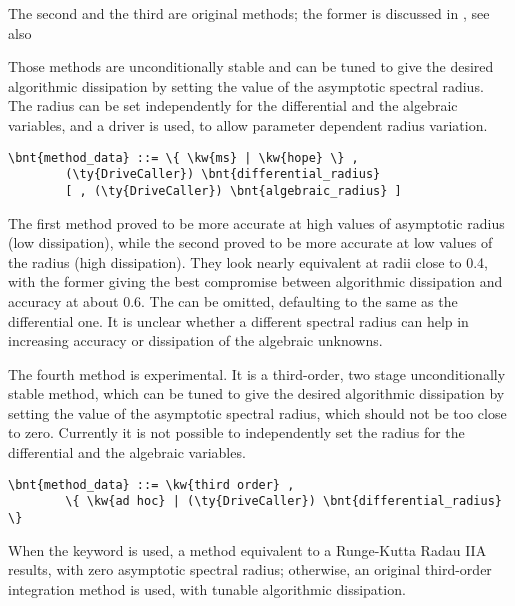 The second and the third are original 
methods; the former is discussed in \cite{MASARATI-LANZ-MANTEGAZZA-2001},
see also
\begin{quote}
\end{quote} 
Those methods are unconditionally stable and can be tuned to give 
the desired algorithmic dissipation
by setting the value of the asymptotic spectral radius.
The radius can be set independently for the differential
and the algebraic variables, and a driver is used, to allow parameter 
dependent radius variation.
\begin{Verbatim}[commandchars=\\\{\}]
    \bnt{method_data} ::= \{ \kw{ms} | \kw{hope} \} ,
        (\ty{DriveCaller}) \bnt{differential_radius}
        [ , (\ty{DriveCaller}) \bnt{algebraic_radius} ]
\end{Verbatim}
The first method proved to be more accurate at high values of asymptotic
radius (low dissipation), while the second proved to be more accurate
at low values of the radius (high dissipation).
They look nearly equivalent at radii close to 0.4, with the former
giving the best compromise between algorithmic dissipation and accuracy 
at about 0.6.
The  can be omitted, defaulting to the same 
as the differential one.
It is unclear whether a different spectral radius can help in increasing
accuracy or dissipation of the algebraic unknowns.

The fourth method is experimental. It is a third-order,
two stage unconditionally stable method, which can be tuned to give 
the desired algorithmic dissipation by setting the value 
of the asymptotic spectral radius, which should not be 
too close to zero.
Currently it is not possible to independently set the radius 
for the differential and the algebraic variables.
\begin{Verbatim}[commandchars=\\\{\}]
    \bnt{method_data} ::= \kw{third order} ,
        \{ \kw{ad hoc} | (\ty{DriveCaller}) \bnt{differential_radius} \}
\end{Verbatim}
When the keyword  is used, a method equivalent
to a Runge-Kutta Radau IIA results, with zero asymptotic
spectral radius; otherwise, an original third-order
integration method is used, with tunable algorithmic dissipation.

